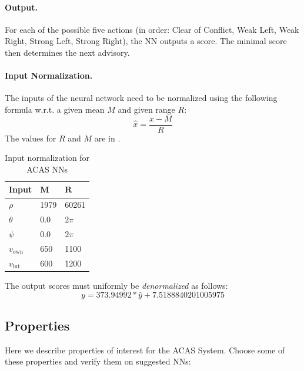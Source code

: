 \documentclass[11pt,fleqn]{article}
\begin{document}
\paragraph*{Output.}
For each of the possible five actions (in order: Clear of Conflict, Weak Left, Weak Right, Strong Left, Strong Right),
the NN outputs a score.
The minimal score then determines the next advisory.

\paragraph*{Input Normalization.}
The inputs of the neural network need to be normalized using the following formula w.r.t. a given mean $M$ and given range $R$:
\[
\hat{x} = \frac{x - M}{R}
\]
The values for $R$ and $M$ are in .
\begin{table}[h]
\caption{Input normalization for ACAS NNs}
\centering
\begin{tabular}{l|l|l}
    \textbf{Input} & $\mathbf{M}$ & $\mathbf{R}$\\\hline
    $\rho$ & 1979 & 60261\\
    $\theta$ & 0.0 & $2\pi$\\
    $\psi$ & 0.0 & $2\pi$\\
    $v_{\text{own}}$ &  650 & 1100\\
    $v_{\text{int}}$ &  600 & 1200\\
\end{tabular}
\label{tab:acas_normalization}
\end{table}


The output scores must uniformly be \emph{denormalized} as follows:
\[
y = 373.94992*\hat{y}+7.5188840201005975
\]

\subsection*{Properties}
Here we describe properties of interest for the ACAS System.
Choose some of these properties and verify them on suggested NNs:

\end{document}
